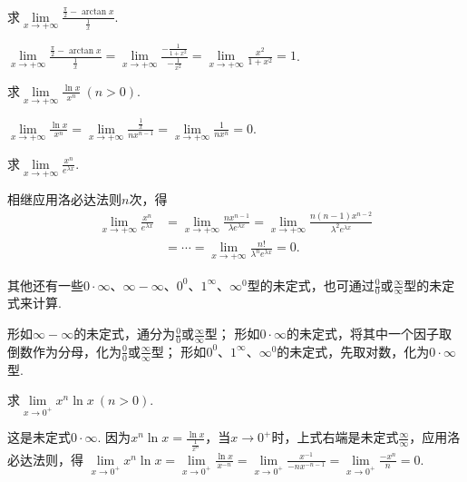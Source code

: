 \begin{example}
\def\l{\lim\limits_{x\to+\infty}}%
求\(\l \frac{\frac{\pi}{2} - \arctan x}{\frac{1}{x}}\).
\begin{solution}
\(\l \frac{\frac{\pi}{2} - \arctan x}{\frac{1}{x}}
= \l \frac{-\frac{1}{1+x^2}}{-\frac{1}{x^2}}
= \l \frac{x^2}{1+x^2} = 1\).
\end{solution}
\end{example}

\begin{example}
\def\l{\lim\limits_{x\to+\infty}}%
求\(\l \frac{\ln x}{x^n}\ (n>0)\).
\begin{solution}
\(\l \frac{\ln x}{x^n}
= \l \frac{\frac{1}{x}}{n x^{n-1}}
= \l \frac{1}{n x^n} = 0\).
\end{solution}
\end{example}

\begin{example}
\def\l{\lim\limits_{x\to+\infty}}%
求\(\l \frac{x^n}{e^{\lambda x}}\).
\begin{solution}
相继应用洛必达法则\(n\)次，得\begin{align*}
\l \frac{x^n}{e^{\lambda x}}
&= \l \frac{n x^{n-1}}{\lambda e^{\lambda x}}
= \l \frac{n(n-1) x^{n-2}}{\lambda^2 e^{\lambda x}} \\
&= \dotsb = \l \frac{n!}{\lambda^n e^{\lambda x}}
= 0.
\end{align*}
\end{solution}
\end{example}

其他还有一些\(0 \cdot \infty\)、\(\infty - \infty\)、\(0^0\)、\(1^\infty\)、\(\infty^0\)型的未定式，也可通过\(\frac{0}{0}\)或\(\frac{\infty}{\infty}\)型的未定式来计算.

形如\(\infty - \infty\)的未定式，通分为\(\frac{0}{0}\)或\(\frac{\infty}{\infty}\)型；
形如\(0 \cdot \infty\)的未定式，将其中一个因子取倒数作为分母，化为\(\frac{0}{0}\)或\(\frac{\infty}{\infty}\)型；
形如\(0^0\)、\(1^\infty\)、\(\infty^0\)的未定式，先取对数，化为\(0 \cdot \infty\)型.

\begin{example}\label{example:微分中值定理.洛必达法则.零乘无穷大型1}
\def\l{\lim\limits_{x\to0^+}}%
求\(\l x^n \ln x\ (n > 0)\).
\begin{solution}
这是未定式\(0\cdot\infty\).
因为\(x^n \ln x = \frac{\ln x}{\frac{1}{x^n}}\)，当\(x\to0^+\)时，上式右端是未定式\(\frac{\infty}{\infty}\)，应用洛必达法则，得%
\(\l x^n \ln x
= \l \frac{\ln x}{x^{-n}}
= \l \frac{x^{-1}}{-nx^{-n-1}}
= \l \frac{-x^n}{n}
= 0\).
\end{solution}
\end{example}

